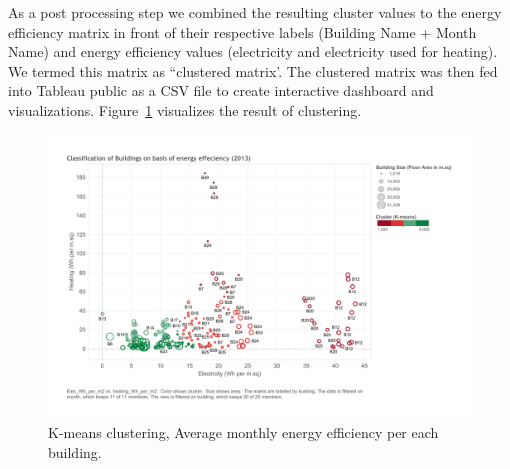 As a post processing step we combined the resulting cluster values to the energy efficiency matrix in front of their respective labels (Building Name + Month Name) and energy efficiency values (electricity and electricity used for heating). We termed this matrix as  ``clustered matrix'. The clustered matrix was then fed into Tableau public as a CSV file to create interactive dashboard and visualizations. Figure~\ref{fig:kmeans} visualizes the result of clustering.  

\begin{figure}[!ht]
    \begin{center}
      \includegraphics[width=\textwidth]{images/kmeans.pdf}
      \caption{K-means clustering, Average monthly energy efficiency per each building.}
      \label{fig:kmeans}
    \end{center}
\end{figure} 


